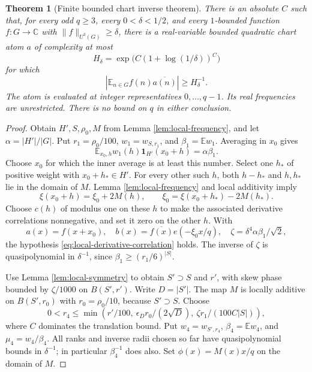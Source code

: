 \documentclass[11pt]{article}
\newtheorem{theorem}{Theorem}[section]
\theoremstyle{definition}
\newcommand{\C}{\mathbb C}
\newcommand{\E}{\mathbb E}
\newcommand{\one}{\mathbf 1}
\numberwithin{equation}{section}
\begin{document}
\begin{theorem}[Finite bounded chart inverse theorem]\label{thm:finite-inverse}
There is an absolute $C$ such that, for every odd $q\ge3$, every $0<\delta<1/2$, and every $1$-bounded function $f:G\to\C$ with $\|f\|_{U^3(G)}\ge\delta$, there is a real-variable bounded quadratic chart atom $a$ of complexity at most
\[
 H_\delta=\exp\bigl(C(1+\log(1/\delta))^C\bigr)
\]
for which
\[
 \left|\E_{n\in G}f(n)\overline{a(n)}\right|\ge H_\delta^{-1}.
\]
The atom is evaluated at integer representatives $0,\ldots,q-1$. Its real frequencies are unrestricted. There is no bound on $q$ in either conclusion.
\end{theorem}
\begin{proof}
Obtain $H',S,\rho_0,M$ from Lemma \ref{lem:local-frequency}, and let $\alpha=|H'|/|G|$. Put $r_1=\rho_0/100$, $w_1=w_{S,r_1}$, and $\beta_1=\E w_1$. Averaging in $x_0$ gives
\[
 \E_{x_0,h}w_1(h)\one_{H'}(x_0+h)=\alpha\beta_1.
\]
Choose $x_0$ for which the inner average is at least this number. Select one $h_*$ of positive weight with $x_0+h_*\in H'$. For every other such $h$, both $h-h_*$ and $h,h_*$ lie in the domain of $M$. Lemma \ref{lem:local-frequency} and local additivity imply
\[
 \xi(x_0+h)=\xi_0+2M(h),\qquad
 \xi_0=\xi(x_0+h_*)-2M(h_*).
\]
Choose $c(h)$ of modulus one on these $h$ to make the associated derivative correlations nonnegative, and set it zero on the other $h$. With
\[
 a(x)=f(x+x_0),\quad b(x)=\overline{f(x)}e(-\xi_0x/q),\quad
 \zeta=\delta^4\alpha\beta_1/\sqrt2,
\]
the hypothesis \eqref{eq:local-derivative-correlation} holds. The inverse of $\zeta$ is quasipolynomial in $\delta^{-1}$, since $\beta_1\ge(r_1/6)^{|S|}$.

Use Lemma \ref{lem:local-symmetry} to obtain $S'\supset S$ and $r'$, with skew phase bounded by $\zeta/1000$ on $B(S',r')$. Write $D=|S'|$. The map $M$ is locally additive on $B(S',r_0)$ with $r_0=\rho_0/10$, because $S'\supset S$. Choose
\[
 0<r_4\le\min\left(r'/100,\ \epsilon_Dr_0/(2\sqrt D),\ \zeta r_1/(100C|S|)\right),
\]
where $C$ dominates the translation bound. Put $w_4=w_{S',r_4}$, $\beta_4=\E w_4$, and $\mu_4=w_4/\beta_4$. All ranks and inverse radii chosen so far have quasipolynomial bounds in $\delta^{-1}$; in particular $\beta_4^{-1}$ does also. Set $\phi(x)=M(x)x/q$ on the domain of $M$.


\end{proof}
\end{document}
